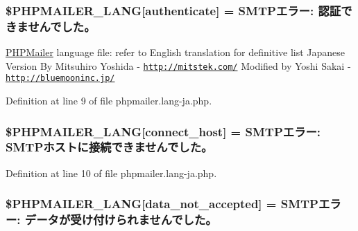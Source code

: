 \subsubsection[{\texorpdfstring{\$\+P\+H\+P\+M\+A\+I\+L\+E\+R\+\_\+\+L\+A\+NG}{$PHPMAILER_LANG}}]{\setlength{\rightskip}{0pt plus 5cm}\$P\+H\+P\+M\+A\+I\+L\+E\+R\+\_\+\+L\+A\+NG\mbox{[}\textquotesingle{}authenticate\textquotesingle{}\mbox{]} = \textquotesingle{}S\+M\+T\+Pエラー\+: 認証できませんでした。\textquotesingle{}}\hypertarget{phpmailer_8lang-ja_8php_a2cb33073c989b85580748e331ed8b4aa}{}\label{phpmailer_8lang-ja_8php_a2cb33073c989b85580748e331ed8b4aa}
\hyperlink{class_p_h_p_mailer}{P\+H\+P\+Mailer} language file\+: refer to English translation for definitive list Japanese Version By Mitsuhiro Yoshida -\/ \href{http://mitstek.com/}{\tt http\+://mitstek.\+com/} Modified by Yoshi Sakai -\/ \href{http://bluemooninc.jp/}{\tt http\+://bluemooninc.\+jp/} 

Definition at line 9 of file phpmailer.\+lang-\/ja.\+php.

\subsubsection[{\texorpdfstring{\$\+P\+H\+P\+M\+A\+I\+L\+E\+R\+\_\+\+L\+A\+NG}{$PHPMAILER_LANG}}]{\setlength{\rightskip}{0pt plus 5cm}\$P\+H\+P\+M\+A\+I\+L\+E\+R\+\_\+\+L\+A\+NG\mbox{[}\textquotesingle{}connect\+\_\+host\textquotesingle{}\mbox{]} = \textquotesingle{}S\+M\+T\+Pエラー\+: S\+M\+T\+Pホストに接続できませんでした。\textquotesingle{}}\hypertarget{phpmailer_8lang-ja_8php_a2ee0cc637a06b96e45600db31c6799ee}{}\label{phpmailer_8lang-ja_8php_a2ee0cc637a06b96e45600db31c6799ee}


Definition at line 10 of file phpmailer.\+lang-\/ja.\+php.

\subsubsection[{\texorpdfstring{\$\+P\+H\+P\+M\+A\+I\+L\+E\+R\+\_\+\+L\+A\+NG}{$PHPMAILER_LANG}}]{\setlength{\rightskip}{0pt plus 5cm}\$P\+H\+P\+M\+A\+I\+L\+E\+R\+\_\+\+L\+A\+NG\mbox{[}\textquotesingle{}data\+\_\+not\+\_\+accepted\textquotesingle{}\mbox{]} = \textquotesingle{}S\+M\+T\+Pエラー\+: データが受け付けられませんでした。\textquotesingle{}}\hypertarget{phpmailer_8lang-ja_8php_a814c6b191205d2361b3233e9c9d6fda5}{}\label{phpmailer_8lang-ja_8php_a814c6b191205d2361b3233e9c9d6fda5}


